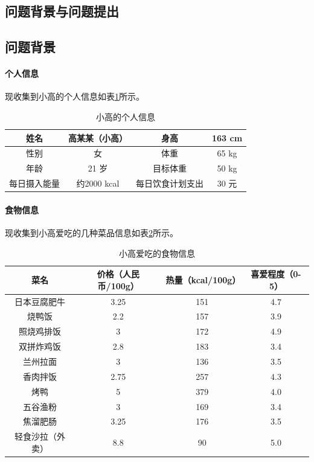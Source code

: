 \documentclass[a4paper,12pt,onecolumn,twoside]{article}
\begin{document}
\subsection{问题背景与问题提出}
\subsection*{问题背景}\label{background}
\paragraph{个人信息~}现收集到小高的个人信息如表\ref{personalinfo}所示。
\begin{table}[H]\label{personalinfo}
	\centering
	\caption{小高的个人信息}
	\begin{tabular}{c|c|c|c} 
		\hline\hline
		姓名 & 高某某（小高）& 身高 & 163 cm  \\\hline
		性别 & 女           & 体重 & 65 kg   \\\hline
		年龄 & 21 岁         & 目标体重 & 50 kg\\\hline
        每日摄入能量 & 约2000 kcal & 每日饮食计划支出 & 30 元\\\hline
		\hline
	\end{tabular}
\end{table}
\paragraph{食物信息~}现收集到小高爱吃的几种菜品信息如表\ref{foodinfo}所示。
\begin{table}[H]\label{foodinfo}
	\centering
	\caption{小高爱吃的食物信息}
	\begin{tabular}{c|c|c|c} 
		\hline\hline
		菜名 & 价格（人民币/100g）& 热量\tablefootnote{数据来自\url{https://www.boohee.com/food}}（kcal/100g）& 喜爱程度（0-5）   \\\hline
		日本豆腐肥牛 & 3.25 & 151 & 4.7  \\\hline
		烧鸭饭 & 2.2  & 157 & 3.9\\\hline
		照烧鸡排饭 & 3 & 172 & 4.9\\\hline
		双拼炸鸡饭 & 2.8 & 183 & 3.4\\\hline
		兰州拉面 & 3 & 136 & 3.5\\\hline
		香肉拌饭 & 2.75 & 257 & 4.3\\\hline
		烤鸭 & 5 & 379 & 4.0\\\hline
		五谷渔粉& 3 & 169 & 3.4\\\hline
		焦溜肥肠& 3.25 & 176 & 3.5 \\\hline
		轻食沙拉（外卖）& 8.8 & 90 & 5.0 \\\hline  
		\hline
	\end{tabular}
\end{table}
\end{document}
